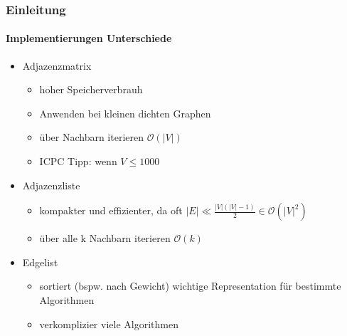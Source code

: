 
\begin{frame}
    \frametitle{Einleitung}
    \framesubtitle{Implementierungen Unterschiede}

\begin{itemize}
    \item Adjazenzmatrix
    \begin{itemize}
        \item hoher Speicherverbrauh
        \item Anwenden bei kleinen dichten Graphen
        \item über Nachbarn iterieren \( \mathcal{O}(|V|)\)
        \item ICPC Tipp: wenn \(V \le 1000 \)
    \end{itemize}

    \item Adjazenzliste
    \begin{itemize}
        \item kompakter und effizienter, da oft \( |E| \ll \frac{|V| (|V| - 1)}{2} \in \mathcal{O}(|V|^2)\)
        \item über alle k Nachbarn iterieren \( \mathcal{O}(k)\)
    \end{itemize}
    \item Edgelist
    \begin{itemize}
        \item sortiert (bspw. nach Gewicht) wichtige Representation für bestimmte Algorithmen
        \item verkomplizier viele Algorithmen
    \end{itemize}
\end{itemize}
\end{frame}
